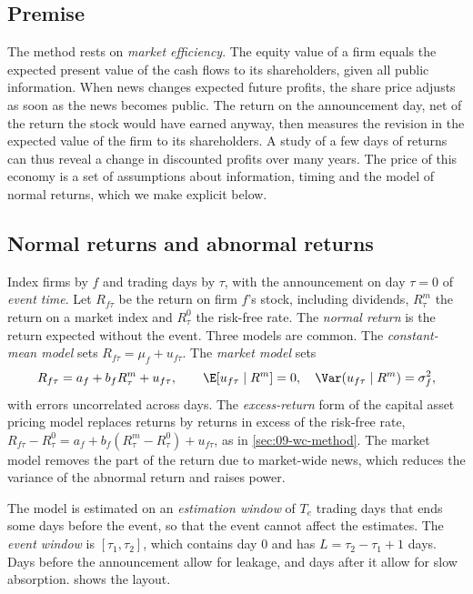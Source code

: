 \subsection{Premise}\label{sec:A-es-premise}

The method rests on \emph{market efficiency}. The equity value of a firm equals the expected present value of the
cash flows to its shareholders, given all public information. When news changes expected future profits, the share
price adjusts as soon as the news becomes public. The return on the announcement day, net of the return the stock
would have earned anyway, then measures the revision in the expected value of the firm to its shareholders. A study
of a few days of returns can thus reveal a change in discounted profits over many years. The price of this economy is
a set of assumptions about information, timing and the model of normal returns, which we make explicit below.

\subsection{Normal returns and abnormal returns}\label{sec:A-es-ar}

Index firms by $f$ and trading days by $\tau$, with the announcement on day $\tau=0$ of \emph{event time}. Let
$R_{f\tau}$ be the return on firm $f$'s stock, including dividends, $R^m_\tau$ the return on a market index and
$R^0_\tau$ the risk-free rate. The \emph{normal return} is the return expected without the event. Three models are
common. The \emph{constant-mean model} sets $R_{f\tau}=\mu_f+u_{f\tau}$. The \emph{market model} sets
\begin{equation}\label{eq:A-es-mm}
R_{f\tau}=a_f+b_f R^m_\tau+u_{f\tau},\qquad \E[u_{f\tau}\mid R^m]=0,\quad \Var(u_{f\tau}\mid R^m)=\sigma_f^2,
\end{equation}
with errors uncorrelated across days. The \emph{excess-return} form of the capital asset pricing model replaces
returns by returns in excess of the risk-free rate,
$R_{f\tau}-R^0_\tau=a_f+b_f(R^m_\tau-R^0_\tau)+u_{f\tau}$, as in \cref{sec:09-wc-method}. The market model removes the
part of the return due to market-wide news, which reduces the variance of the abnormal return and raises power.

The model is estimated on an \emph{estimation window} of $T_e$ trading days that ends some days before the event,
so that the event cannot affect the estimates. The \emph{event window} is $[\tau_1,\tau_2]$, which contains day
0 and has $L=\tau_2-\tau_1+1$ days. Days before the announcement allow for leakage, and days after it allow for slow
absorption.  shows the layout.

